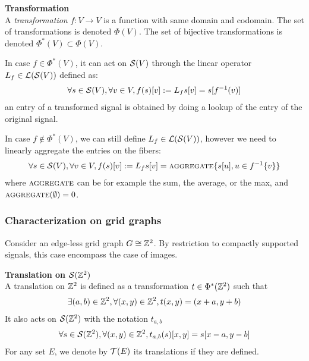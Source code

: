 \begin{definition}\textbf{Transformation}\\
A \emph{transformation} $f: V \rightarrow V$ is a function with same domain and codomain. The set of transformations is denoted $\Phi(V)$. The set of bijective transformations is denoted $\Phi^*(V) \subset \Phi(V)$.

In case $f \in \Phi^*(V)$, it can act on $\mathcal{S}(V)$ through the linear operator $L_f \in \mathcal{L}(\mathcal{S}(V))$ defined as:
\begin{gather*}
\forall s \in \mathcal{S}(V), \forall v \in V, f(s)[v] := L_f s[v] = s[f^{-1}(v)]
\end{gather*}
\ie an entry of a transformed signal is obtained by doing a lookup of the entry of the original signal.

In case $f \notin \Phi^*(V)$, we can still define $L_f \in \mathcal{L}(\mathcal{S}(V))$, however we need to linearly aggregate the entries on the fibers:
\begin{gather*}
\forall s \in \mathcal{S}(V), \forall v \in V, f(s)[v] := L_f s[v] = \operatorname{\textsc{aggregate}}\{s[u], u \in f^{-1}\{v\}\}
\end{gather*}
where $\operatorname{\textsc{aggregate}}$ can be for example the sum, the average, or the max, and $\operatorname{\textsc{aggregate}}(\emptyset) = 0$.
\end{definition}

\subsubsection{Characterization on grid graphs}

Consider an edge-less grid graph \ie $G \cong \mathbb{Z}^2$. By restriction to compactly supported signals, this case encompass the case of images.

\begin{definition}\textbf{Translation on $\mathcal{S}(\mathbb{Z}^2)$}\\
A translation on $\mathbb{Z}^2$ is defined as a transformation $t \in \Phi^*(\mathbb{Z}^2)$ such that
\begin{gather*}
\exists (a,b) \in \mathbb{Z}^2, \forall (x,y) \in \mathbb{Z}^2, t(x,y) = (x+a,y+b)
\end{gather*}
It also acts on $\mathcal{S}(\mathbb{Z}^2)$ with the notation $t_{a,b}$ \ie
\begin{gather*}
\forall s \in \mathcal{S}(\mathbb{Z}^2), \forall (x,y) \in \mathbb{Z}^2, t_{a,b}(s)[x,y] = s[x-a, y-b]
\end{gather*}
For any set $E$, we denote by $\mathcal{T}(E)$ its translations if they are defined.
\end{definition}

